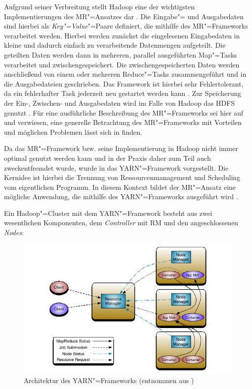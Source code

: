 Aufgrund seiner Verbreitung stellt Hadoop eine der wichtigsten Implementierungen des \gls{MR}"=Ansatzes dar \cite{PoweredByHadoop}.
Die Eingabe"= und Ausgabedaten sind hierbei als \emph{Key"=Value}"=Paare definiert, die mithilfe des \gls{MR}"=Frameworks verarbeitet werden.
Hierbei werden zunächst die eingelesenen Eingabedaten in kleine und dadurch einfach zu verarbeitende Datenmengen aufgeteilt.
Die geteilten Daten werden dann in mehreren, parallel ausgeführten Map"=Tasks verarbeitet und zwischengespeichert.
Die zwischengespeicherten Daten werden anschließend von einem oder mehreren Reduce"=Tasks zusammengeführt und in die Ausgabedateien geschrieben.
Das Framework ist hierbei sehr Fehlertolerant, da ein fehlerhafter Task jederzeit neu gestartet werden kann \cite{Dean2004,Dean2010}.
Zur Speicherung der Ein-, Zwischen- und Ausgabedaten wird im Falle von Hadoop das HDFS genutzt \cite{HadoopMapRedTutorial271}.
Für eine ausführliche Beschreibung des \gls{MR}"=Frameworks sei hier auf \cite{Dean2004} und \cite{Dean2010} verwiesen, eine generelle Betrachtung des \gls{MR}"=Frameworks mit Vorteilen und möglichen Problemen lässt sich in \cite{Lee2012} finden.

Da das \gls{MR}"=Framework bzw. seine Implementierung in Hadoop nicht immer optimal genutzt werden kann und in der Praxis daher zum Teil auch zweckentfremdet wurde, wurde in \cite{Vavilapalli2013} das YARN"=Framework vorgestellt.
Die Kernidee ist hierbei die Trennung von Ressourcenmanagement und Scheduling vom eigentlichen Programm.
In diesem Kontext bildet der \gls{MR}"=Ansatz eine mögliche Anwendung, die mithilfe des YARN"=Frameworks ausgeführt wird \cite{Vavilapalli2013}.

Ein Hadoop"=Cluster mit dem YARN"=Framework besteht aus zwei wesentlichen Komponenten, dem \emph{Controller} mit \gls{RM} und den angeschlossenen \emph{Nodes}:

\begin{figure}[h]
    \includegraphics{./resources/yarn_architecture.png}
    \caption[Architektur des YARN"=Frameworks]
    {Architektur des YARN"=Frameworks (entnommen aus \cite{HadoopYarnArch271})}
    \label{fig:yarnarch}
\end{figure}


